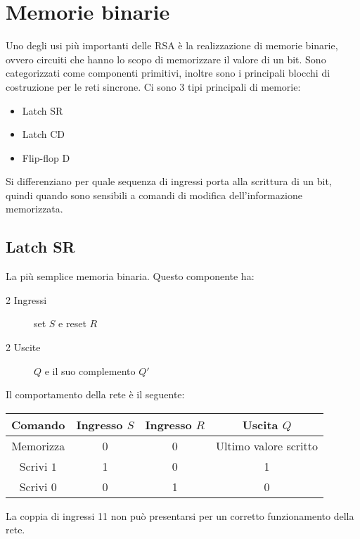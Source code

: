 \documentclass{article}
\begin{document}
\section{Memorie binarie}

Uno degli usi più importanti delle RSA è la realizzazione di memorie binarie, ovvero circuiti che hanno lo scopo di memorizzare il valore di un bit.
Sono categorizzati come componenti primitivi, inoltre sono i principali blocchi di costruzione per le reti sincrone.
Ci sono 3 tipi principali di memorie:

\begin{itemize}
    \item Latch SR
    \item Latch CD
    \item Flip-flop D
\end{itemize}

\noindent
Si differenziano per quale sequenza di ingressi porta alla scrittura di un bit, quindi quando sono sensibili a comandi di modifica dell’informazione memorizzata.

\subsection{Latch SR}

La più semplice memoria binaria.
Questo componente ha:

\begin{description}
    \item[2 Ingressi] set $S$ e reset $R$
    \item[2 Uscite] $Q$ e il suo complemento $Q'$
\end{description}

\noindent
Il comportamento della rete è il seguente:

\begin{center}
\begin{tabular}{ |c|c|c|c| }
\hline
Comando & Ingresso $S$ & Ingresso $R$ & Uscita $Q$  \\
\hline
\hline
Memorizza & 0 & 0 & Ultimo valore scritto \\
Scrivi $1$ & 1 & 0 & 1 \\
Scrivi $0$ & 0 & 1 & 0 \\
\hline
\end{tabular}
\end{center}

\noindent
La coppia di ingressi 11 non può presentarsi per un corretto funzionamento della rete.
\end{document}
